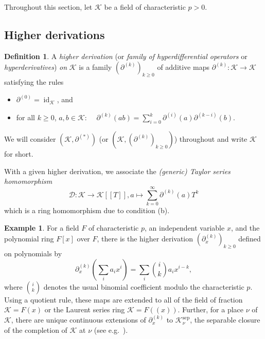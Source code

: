 \documentclass[10pt,a4paper]{amsart}
\theoremstyle{plain} %
\theoremstyle{definition}
\newtheorem{Definition}[Theorem]{Definition}
\newtheorem{Example}[Theorem]{Example}
\theoremstyle{remark}
\newcommand{\cK}{\mathcal{K}}   %
\newcommand{\id}{\operatorname{id}}
\newcommand{\ps}[1]{[\![#1]\!]}  %
\newcommand{\sep}{\mathrm{sep}}
\newcommand{\hd}[2]{\partial^{(#1)}\!\!\left(#2\right)} %
\newcommand{\hde}[1]{\partial^{(#1)}}  %
\newcommand{\D}{\mathcal{D}} %
\numberwithin{equation}{subsection}
\begin{document}
\medskip

    Throughout this section, let $\cK$ be a field of characteristic $p>0$. 

\subsection{Higher derivations}
    
    \begin{Definition}\label{D:hyperder}
    A \emph{higher derivation} (or \emph{family of hyperdifferential operators} or \emph{hyperderivatives}) \emph{on} $\cK$ is a family $(\hde{k})_{k\geq 0}$ of additive maps $\hde{k}:\cK\to \cK$ satisfying the rules
    \begin{itemize}
        \item[(a)] $\hde{0}=\id_{\cK}$, and
        \item[(b)] for all $k\geq 0$, $a,b\in \cK$: $\quad \hd{k}{ab}= \sum_{i=0}^k \hd{i}{a}\hd{k-i}{b}$.
    \end{itemize}
    \end{Definition}

    We will consider $(\cK, \hde{*})$ (or $(\cK, (\hde{k})_{k \geq 0{}})$) throughout and write $\cK$ for short. 

With a given higher derivation, we associate the \emph{(generic) Taylor series homomorphism}
\begin{equation}\label{E:LmathcalD}
    \D:\cK\to \cK\ps{T}, a\mapsto \sum_{k=0}^\infty \hd{k}{a}T^k 
\end{equation}
which is a ring homomorphism due to condition (b).

\begin{Example}\label{Example:Hyperd}
For a field $F$ of characteristic $p$, 
an independent variable $x$, and the polynomial ring $F[x]$ over $F$, there is the higher derivation $(\hde{k}_x)_{k\geq 0}$ defined on polynomials by
\[
\hde{k}_{x} \left( \sum_{i} a_i x^i \right) = \sum_{i} \binom{i}{k} a_i x^{i-k}, 
\]
 where $\binom{i}{k}$ denotes the usual binomial coefficient modulo the characteristic $p$. Using  
 a quotient rule, these maps are extended to all of the field of fraction $\cK=F(x)$ or the Laurent series ring $\cK=F(\!(x)\!)$.
Further, for a place $\nu$ of $\cK$, there are unique continuous extensions of $\hde{k}_{x}$ to $\cK_{\nu}^{\sep}$, the separable closure of the completion of $\cK$ at $\nu$ (see e.g.~\cite[Theorems 5 \& 6]{kc:dp}).
\end{Example}
\end{document}
